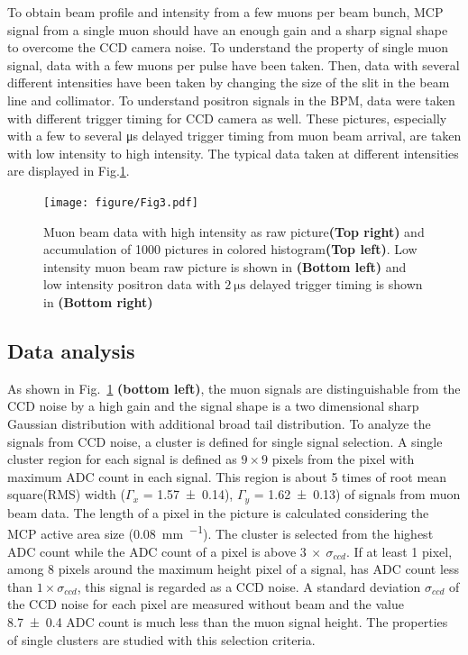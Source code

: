 \documentclass[preprint,3p,twocolumn]{elsarticle}
\begin{document}
To obtain beam profile and intensity from a few muons per beam bunch, MCP signal from a single muon should have an enough gain and a sharp signal shape to overcome the CCD camera noise.
To understand the property of single muon signal, data with a few muons per pulse have been taken. Then, data with several different intensities have been taken by changing the size of the slit in the beam line and collimator. To understand positron signals in the BPM, data were taken with different trigger timing for CCD camera as well. These pictures, especially with a few to several \si{\micro\s} delayed trigger timing from muon beam arrival, are taken with low intensity to high intensity.
The typical data taken at different intensities are displayed in Fig.\ref{fig:single_cluster}.

\begin{figure}[htb]
	\begin{minipage}[t]{70mm}
		\texttt{[image: figure/Fig3.pdf]}
	\end{minipage}
	\caption{Muon beam data with high intensity as raw picture{\bf(Top right)} and accumulation of 1000 pictures in colored histogram{\bf(Top left)}.
	Low intensity muon beam raw picture is shown in {\bf(Bottom left)} and low intensity positron data with $\SI{2}{\micro\s}$ delayed trigger timing is shown in {\bf(Bottom right)
	}}	
	\label{fig:single_cluster}
\end{figure}



\subsection{Data analysis}

As shown in Fig.~\ref{fig:single_cluster} {\bf (bottom left)}, the muon signals are distinguishable from the CCD noise by a high gain and the signal shape is a two dimensional sharp Gaussian distribution with additional broad tail distribution. 
To analyze the signals from CCD noise, a cluster is defined for single signal selection. A single cluster region for each signal is defined as $9\times9$ pixels from the pixel with maximum ADC count in each signal. This region is about 5 times of root mean square(RMS) width ($\Gamma_{x}$ = \SI{1.57 \pm 0.14}{\pixel}), $\Gamma_{y}$ = \SI{1.62 \pm 0.13}{\pixel}) of signals from muon beam data. The length of a pixel in the picture is calculated considering the MCP active area size (\SI{0.08}{\mm \per \pixel}).
The cluster is selected from the highest ADC count while the ADC count of a pixel is above $3~\times~\sigma_{ccd}$.
If at least 1 pixel, among 8 pixels around the maximum height pixel of a signal, has ADC count less than $1\times\sigma_{ccd}$, this signal is regarded as a CCD noise. 
A standard deviation $\sigma_{ccd}$ of the CCD noise for each pixel are measured without beam and the value \num{8.7 \pm 0.4} ADC count is much less than the muon signal height. The properties of single clusters are studied with this selection criteria.
\end{document}
